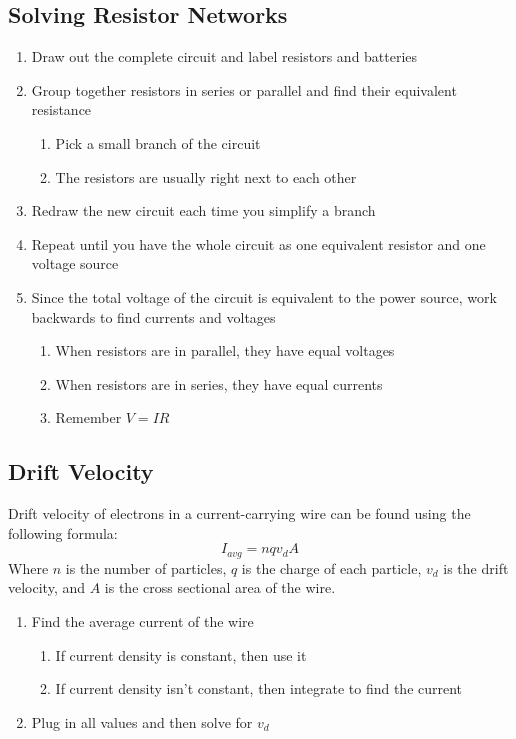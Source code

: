 \documentclass{article}
\begin{document}
\subsection{Solving Resistor Networks}
\begin{enumerate}
\item Draw out the complete circuit and label resistors and batteries
\item Group together resistors in series or parallel and find their equivalent resistance
  \begin{enumerate}
  \item Pick a small branch of the circuit
  \item The resistors are usually right next to each other
  \end{enumerate}
\item Redraw the new circuit each time you simplify a branch
\item Repeat until you have the whole circuit as one equivalent resistor and one voltage source
\item Since the total voltage of the circuit is equivalent to the power source, work backwards to find currents and voltages
  \begin{enumerate}
  \item When resistors are in parallel, they have equal voltages
  \item When resistors are in series, they have equal currents
  \item Remember $V=IR$
  \end{enumerate}
\end{enumerate}
\subsection{Drift Velocity}
Drift velocity of electrons in a current-carrying wire can be found using the following formula:
\[I_{avg} = nqv_dA\]
Where $n$ is the number of particles, $q$ is the charge of each particle, $v_d$ is the drift velocity, and $A$ is the cross sectional area of the wire.
\begin{enumerate}
\item Find the average current of the wire
  \begin{enumerate}
    \item If current density is constant, then use it
    \item If current density isn't constant, then integrate to find the current
    \end{enumerate}
  \item Plug in all values and then solve for $v_d$
\end{enumerate}
\end{document}
